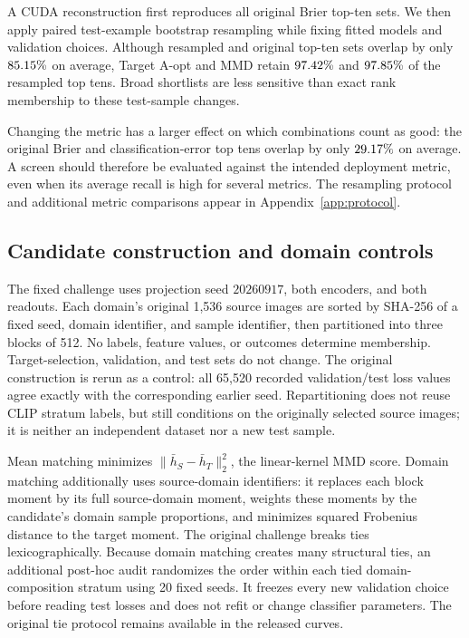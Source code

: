 A CUDA reconstruction first reproduces all original Brier top-ten sets. We then apply paired test-example bootstrap resampling while fixing fitted models and validation choices. Although resampled and original top-ten sets overlap by only $85.15\%$ on average, Target A-opt and MMD retain $97.42\%$ and $97.85\%$ of the resampled top tens. Broad shortlists are less sensitive than exact rank membership to these test-sample changes.

Changing the metric has a larger effect on which combinations count as good: the original Brier and classification-error top tens overlap by only $29.17\%$ on average. A screen should therefore be evaluated against the intended deployment metric, even when its average recall is high for several metrics. The resampling protocol and additional metric comparisons appear in Appendix~\ref{app:protocol}.


\subsection{Candidate construction and domain controls}
\label{app:construction}
The fixed challenge uses projection seed $20260917$, both encoders, and both readouts. Each domain's original 1,536 source images are sorted by SHA-256 of a fixed seed, domain identifier, and sample identifier, then partitioned into three blocks of 512. No labels, feature values, or outcomes determine membership. Target-selection, validation, and test sets do not change. The original construction is rerun as a control: all 65,520 recorded validation/test loss values agree exactly with the corresponding earlier seed. Repartitioning does not reuse CLIP stratum labels, but still conditions on the originally selected source images; it is neither an independent dataset nor a new test sample.

Mean matching minimizes $\|\bar h_S-\bar h_T\|_2^2$, the linear-kernel MMD score. Domain matching additionally uses source-domain identifiers: it replaces each block moment by its full source-domain moment, weights these moments by the candidate's domain sample proportions, and minimizes squared Frobenius distance to the target moment. The original challenge breaks ties lexicographically. Because domain matching creates many structural ties, an additional post-hoc audit randomizes the order within each tied domain-composition stratum using 20 fixed seeds. It freezes every new validation choice before reading test losses and does not refit or change classifier parameters. The original tie protocol remains available in the released curves.

